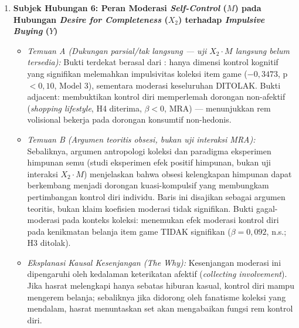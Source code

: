 \documentclass[12pt,a4paper]{article}
\numberwithin{equation}{section}
\numberwithin{table}{section}
\numberwithin{figure}{section}
\begin{document}
\begin{enumerate}
  \item \textbf{Subjek Hubungan 6: Peran Moderasi \emph{Self-Control} ($M$) pada Hubungan \emph{Desire for Completeness} ($X_2$) terhadap \emph{Impulsive Buying} ($Y$)}
  \begin{itemize}
    \item \emph{Temuan A (Dukungan parsial/tak langsung — uji $X_2 \cdot M$ langsung belum tersedia):} Bukti terdekat berasal dari \citet{artadita2024how}: hanya dimensi kontrol kognitif yang signifikan melemahkan impulsivitas koleksi item game ($-0{,}3473$, p$<0{,}10$, Model 3), sementara moderasi keseluruhan DITOLAK. Bukti adjacent: \citet{apidana2022peran} membuktikan kontrol diri memperlemah dorongan non-afektif (\emph{shopping lifestyle}, H4 diterima, $\beta<0$, MRA) — menunjukkan rem volisional bekerja pada dorongan konsumtif non-hedonis.
    \item \emph{Temuan B (Argumen teoritis obsesi, bukan uji interaksi MRA):} Sebaliknya, argumen antropologi koleksi \citet{belk1995collecting} dan paradigma eksperimen himpunan semu \citet{barasz2017pseudo} (studi eksperimen efek positif himpunan, bukan uji interaksi $X_2 \cdot M$) menjelaskan bahwa obsesi kelengkapan himpunan dapat berkembang menjadi dorongan kuasi-kompulsif yang membungkam pertimbangan kontrol diri individu. Baris ini disajikan sebagai argumen teoritis, bukan klaim koefisien moderasi tidak signifikan. Bukti gagal-moderasi pada konteks koleksi: \citet{artadita2024how} menemukan efek moderasi kontrol diri pada kenikmatan belanja item game TIDAK signifikan ($\beta=0{,}092$, n.s.; H3 ditolak).
    \item \emph{Eksplanasi Kausal Kesenjangan (\emph{The Why}):} Kesenjangan moderasi ini dipengaruhi oleh kedalaman keterikatan afektif (\emph{collecting involvement}). Jika hasrat melengkapi hanya sebatas hiburan kasual, kontrol diri mampu mengerem belanja; sebaliknya jika didorong oleh fanatisme koleksi yang mendalam, hasrat menuntaskan set akan mengabaikan fungsi rem kontrol diri.
  \end{itemize}


\end{enumerate}
\end{document}

